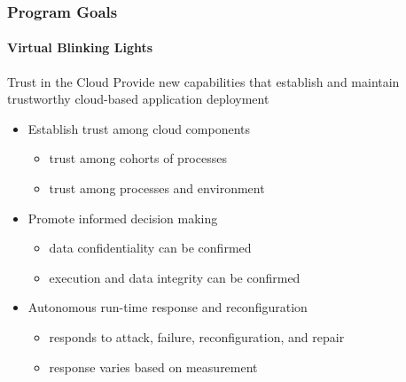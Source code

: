 \documentclass{beamer}
\begin{document}
\begin{frame}
  \frametitle{Program Goals}
  \framesubtitle{Virtual Blinking Lights}
  \begin{block}{Trust in the Cloud}
    Provide new capabilities that establish and maintain trustworthy
    cloud-based application deployment
  \end{block}
  \begin{itemize}
  \item Establish trust among cloud components
    \begin{itemize}
    \item trust among cohorts of processes
    \item trust among processes and environment
    \end{itemize}
  \item Promote informed decision making
    \begin{itemize}
    \item data confidentiality can be confirmed
    \item execution and data integrity can be confirmed
    \end{itemize}
  \item Autonomous run-time response and reconfiguration
    \begin{itemize}
    \item responds to attack, failure, reconfiguration, and repair 
    \item response varies based on measurement
    \end{itemize}
  \end{itemize}
\end{frame}
\end{document}
